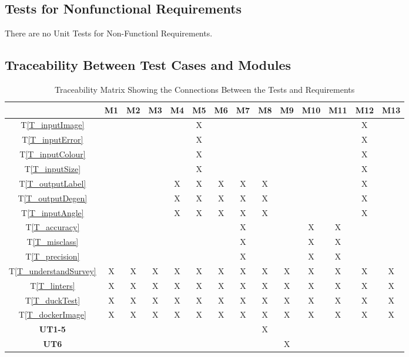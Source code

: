 \documentclass[12pt, titlepage]{article}
\newcommand{\tref}[1]{T\ref{#1}}
\begin{document}
\subsection{Tests for Nonfunctional Requirements}

There are no Unit Tests for Non-Functionl Requirements.

\subsection{Traceability Between Test Cases and Modules}

\begin{table}[h!]
  \centering
  \begin{tabular}{|c|c|c|c|c|c|c|c|c|c|c|c|c|c|}
  \hline
    & M1
    & M2
    & M3
    & M4
    & M5
    & M6
    & M7
    & M8
    & M9
    & M10
    & M11
    & M12
    & M13
  \\ \hline
  \tref{T_inputImage}           & & & & &X& & & & & & &X& \\ \hline
  \tref{T_inputError}           & & & & &X& & & & & & &X& \\ \hline
  \tref{T_inputColour}          & & & & &X& & & & & & &X& \\ \hline
  \tref{T_inputSize}            & & & & &X& & & & & & &X& \\ \hline
  \tref{T_outputLabel}          & & & &X&X&X&X&X& & & &X& \\ \hline
  \tref{T_outputDegen}          & & & &X&X&X&X&X& & & &X& \\ \hline
  \tref{T_inputAngle}           & & & &X&X&X&X&X& & & &X& \\ \hline
  \tref{T_accuracy}             & & & & & & &X& & &X&X& & \\ \hline
  \tref{T_misclass}             & & & & & & &X& & &X&X& & \\ \hline
  \tref{T_precision}            & & & & & & &X& & &X&X& & \\ \hline
  \tref{T_understandSurvey}     &X&X&X&X&X&X&X&X&X&X&X&X&X\\ \hline
  \tref{T_linters}              &X&X&X&X&X&X&X&X&X&X&X&X&X\\ \hline
  \tref{T_duckTest}             &X&X&X&X&X&X&X&X&X&X&X&X&X\\ \hline
  \tref{T_dockerImage}          &X&X&X&X&X&X&X&X&X&X&X&X&X\\ \hline
  \textbf{UT1-5}                & & & & & & & &X& & & & & \\ \hline
  \textbf{UT6}                  & & & & & & & & &X& & & & \\ \hline
  \end{tabular}
  \caption{Traceability Matrix Showing the Connections Between the Tests and Requirements}
  \label{Table:A_trace}
\end{table}
\end{document}
